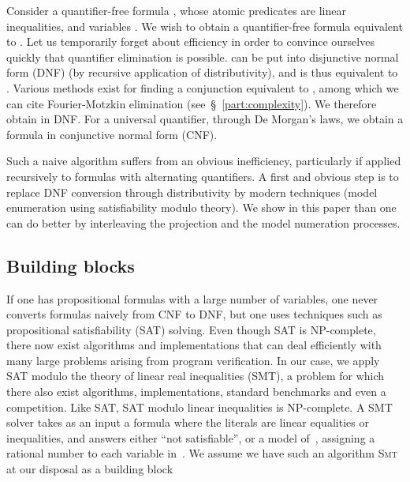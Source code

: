 Consider a quantifier-free formula , whose atomic predicates are linear inequalities, and variables . We wish to obtain a quantifier-free formula  equivalent to . Let us temporarily forget about efficiency in order to convince ourselves quickly that quantifier elimination is possible.  can be put into disjunctive normal form (DNF)  (by recursive application of distributivity), and  is thus equivalent to . Various methods exist for finding a conjunction  equivalent to , among which we can cite Fourier-Motzkin elimination (see~\S~\ref{part:complexity}). We therefore obtain  in DNF. For a universal quantifier, through De Morgan's laws, we obtain a formula in conjunctive normal form (CNF).

Such a naive algorithm suffers from an obvious inefficiency, particularly if applied recursively to formulas with alternating quantifiers. A first and obvious step is to replace DNF conversion through distributivity by modern techniques (model enumeration using satisfiability modulo theory). We show in this paper than one can do better by interleaving the projection and the model numeration processes.

\subsection{Building blocks}
If one has propositional formulas with a large number of variables, one never converts formulas naively from CNF to DNF, but one uses techniques such as propositional satisfiability (SAT) solving. Even though SAT is NP-complete, there now exist algorithms and implementations that can deal efficiently with many large problems arising from program verification. In our case, we apply SAT modulo the theory of linear real inequalities (SMT), a problem for which there also exist algorithms, implementations, standard benchmarks and even a competition. Like SAT, SAT modulo linear inequalities is NP-complete. A SMT solver takes as an input a formula  where the literals are linear equalities or inequalities, and answers either ``not satisfiable'', or a model of~, assigning a rational number to each variable in~. We assume we have such an algorithm \textsc{Smt} at our disposal as a building block

